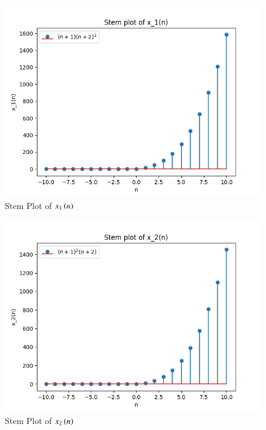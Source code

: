 \documentclass[journal,12pt,twocolumn]{IEEEtran}
\theoremstyle{remark}
\begin{document}
\begin{figure}[htbp]
    \centering
    \includegraphics[width=1\columnwidth]{figs/x1_plot.png}
    \caption{Stem Plot of $x_1\left(n\right)$}
    \label{fig:x1}
\end{figure}

\begin{figure}[htbp]
    \centering
    \includegraphics[width=1\columnwidth]{figs/x2_plot.png}
    \caption{Stem Plot of $x_2\left(n\right)$}
    \label{fig:x2}
\end{figure}
\end{document}
